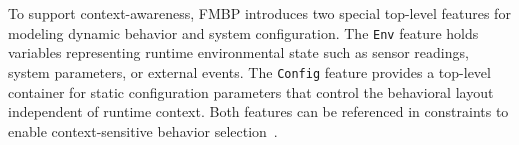 To support context-awareness, FMBP introduces two special top-level features for modeling dynamic behavior and system configuration.
The \texttt{Env} feature holds variables representing runtime environmental state such as sensor readings, system parameters, or external events.
The \texttt{Config} feature provides a top-level container for static configuration parameters that control the behavioral layout independent of runtime context.
Both features can be referenced in constraints to enable context-sensitive behavior selection~\cite{felber_comprehensible_2025}.